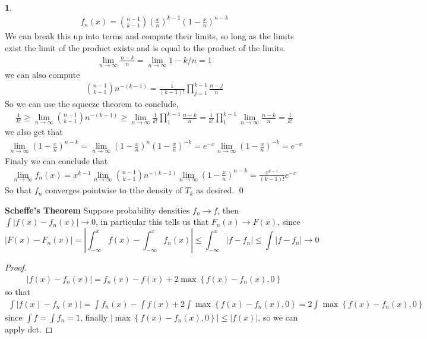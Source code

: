 \documentclass{article}
\theoremstyle{definition}
\newtheorem{pb}{}
\newcommand{\set}[1]{\left\{#1\right\}}
\newcommand{\abs}[1]{\left\vert#1\right\vert}
\begin{document}
\begin{pb}
        \begin{align*}
            f_n(x) = \binom{n-1}{k-1}\left(\frac{x}{n}\right)^{k-1}\left(1 - \frac{x}{n}\right)^{n-k}
        \end{align*}
        We can break this up into terms and compute their limits, so long as the limits exist the limit of the product exists and is equal to the product of the limits.
        \begin{align*}
            \lim_{n \to \infty} \frac{n-k}{n} = \lim_{n\to\infty}1 - k/n = 1
        \end{align*}
        we can also compute
        \begin{align*}
            \binom{n-1}{k-1}n^{-(k-1)} = \frac{1}{(k-1)!}\prod_{j=1}^{k-1} \frac{n-j}{n}
        \end{align*}
        So we can use the squeeze theorem to conclude, 
        \begin{align*}
            \frac{1}{k!} \geq \lim_{n\to\infty}\binom{n-1}{k-1}n^{-(k-1)} \geq \lim_{n\to\infty}\frac{1}{k!}\prod_1^{k-1}\frac{n-k}{n} = \frac{1}{k!}\prod_1^{k-1} \lim_{n \to \infty}\frac{n-k}{n} = \frac{1}{k!}
        \end{align*}
        we also get that
        \begin{align*}
            \lim_{n\to\infty}\left(1 - \frac{x}{n}\right)^{n-k} = \lim_{n\to\infty}\left(1 - \frac{x}{n}\right)^{n}\left(1 - \frac{x}{n}\right)^{-k} = e^{-x}\lim_{n\to\infty}\left(1 - \frac{x}{n}\right)^{-k} = e^{-x}
        \end{align*}
        Finaly we can conclude that
        \begin{align*}
            \lim_{n\to\infty}f_n(x) = x^{k-1}\lim_{n\to\infty}\binom{n-1}{k-1}n^{-(k-1)}\lim_{n\to\infty}\left(1 - \frac{x}{n}\right)^{n-k} = \frac{x^{k-1}}{(k-1)!}e^{-x}
        \end{align*}
        So that \(f_n\) converges pointwise to tthe density of \(T_k\) as desired. \qed
        

        \textbf{Scheffe's Theorem} Suppose probability densities \(f_n \to f\), then \(\int \abs{f(x) - f_n(x)} \to 0\), in particular this tells us that \(F_n(x) \to F(x)\), since \[\abs{F(x) - F_n(x)} = \abs{\int_{-\infty}^x f(x) - \int_{-\infty}^xf_n(x)} \leq \int_{-\infty}^x\abs{f - f_n} \leq \int \abs{f-f_n} \to 0\]
        \begin{proof}
            \begin{align*}
                \abs{f(x) - f_n(x)} = f_n(x) - f(x) + 2\max\set{f(x) - f_n(x),0}
            \end{align*}
            so that
            \begin{align*}
                \int \abs{f(x) - f_n(x)} = \int f_n(x) - \int f(x) + 2\int \max\set{f(x) - f_n(x),0} = 2\int \max\set{f(x) - f_n(x),0}
            \end{align*}
            since \(\int f = \int f_n =1\), finally \(\abs{\max\set{f(x) - f_n(x),0}} \leq \abs{f(x)}\), so we can apply dct.
        \end{proof}
    \end{pb}
\end{document}
